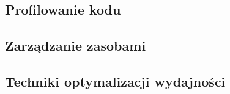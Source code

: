 \documentclass[12pt]{Tech}
\begin{document}
\subsection{Profilowanie kodu}

\subsection{Zarządzanie zasobami}

\subsection{Techniki optymalizacji wydajności}


\newpage
 \nocite{optimization, audio, ui, navMesh, random}
\end{document}
